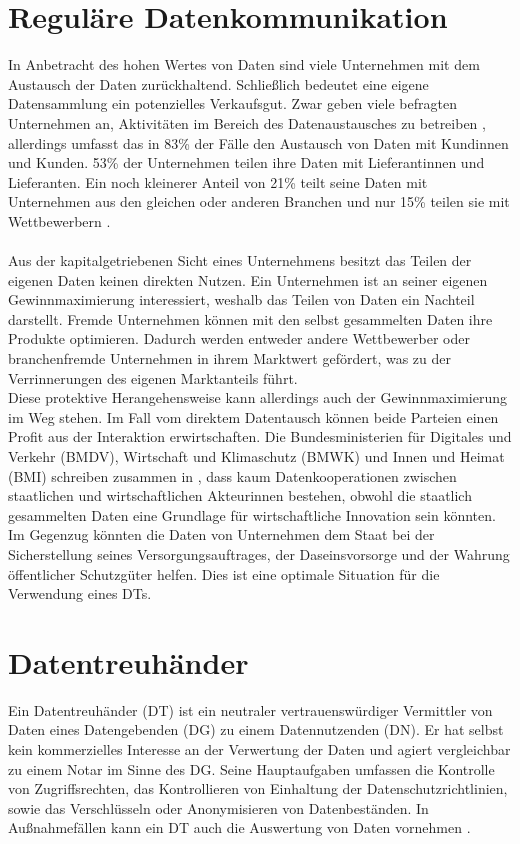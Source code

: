 \documentclass[
	fontsize=11pt,
	headings=small,
	parskip=half,           %
	bibliography=totoc,
	numbers=noenddot,       %
	open=any,               %
]{scrreprt}
\begin{document}
\section{Reguläre Datenkommunikation}
In Anbetracht des hohen Wertes von Daten sind viele Unternehmen mit dem Austausch der Daten zurückhaltend. Schließlich bedeutet eine eigene Datensammlung ein potenzielles Verkaufsgut. Zwar geben viele befragten Unternehmen an, Aktivitäten im Bereich des Datenaustausches zu betreiben \cite{dt-fedkenhauer2017datenaustausch}, allerdings umfasst das in 83\% der Fälle den Austausch von Daten mit Kundinnen und Kunden. 53\% der Unternehmen teilen ihre Daten mit Lieferantinnen und Lieferanten. Ein noch kleinerer Anteil von 21\% teilt seine Daten mit Unternehmen aus den gleichen oder anderen Branchen und nur 15\% teilen sie mit Wettbewerbern \cite{dt-fedkenhauer2017datenaustausch}. \\\\
Aus der kapitalgetriebenen Sicht eines Unternehmens besitzt das Teilen der eigenen Daten keinen direkten Nutzen. Ein Unternehmen ist an seiner eigenen Gewinnmaximierung interessiert, weshalb das Teilen von Daten ein Nachteil darstellt. Fremde Unternehmen können mit den selbst gesammelten Daten ihre Produkte optimieren. Dadurch werden entweder andere Wettbewerber oder branchenfremde Unternehmen in ihrem Marktwert gefördert, was zu der Verrinnerungen des eigenen Marktanteils führt. \\
Diese protektive Herangehensweise kann allerdings auch der Gewinnmaximierung im Weg stehen. Im Fall vom direktem Datentausch können beide Parteien einen Profit aus der Interaktion erwirtschaften. Die Bundesministerien für Digitales und Verkehr (BMDV), Wirtschaft und Klimaschutz (BMWK) und Innen und Heimat (BMI) schreiben zusammen in \cite{dt-bundesregierung2021datenstrategie}, dass kaum Datenkooperationen zwischen staatlichen und wirtschaftlichen Akteurinnen bestehen, obwohl die staatlich gesammelten Daten eine Grundlage für wirtschaftliche Innovation sein könnten. Im Gegenzug könnten die Daten von Unternehmen dem Staat bei der Sicherstellung seines Versorgungsauftrages, der Daseinsvorsorge und der Wahrung öffentlicher Schutzgüter helfen. Dies ist eine optimale Situation für die Verwendung eines DTs.
\section{Datentreuhänder}
\label{sec:dt}
Ein Datentreuhänder (DT) ist ein neutraler vertrauenswürdiger Vermittler von Daten eines Datengebenden (DG) zu einem Datennutzenden (DN). Er hat selbst kein kommerzielles Interesse an der Verwertung der Daten und agiert vergleichbar zu einem Notar im Sinne des DG. Seine Hauptaufgaben umfassen die Kontrolle von Zugriffsrechten, das Kontrollieren von Einhaltung der Datenschutzrichtlinien, sowie das Verschlüsseln oder Anonymisieren von Datenbeständen. In Außnahmefällen kann ein DT auch die Auswertung von Daten vornehmen \cite{dt-bundesregierung2021datenstrategie,dt-richter2020ddvtalk}.
\end{document}

